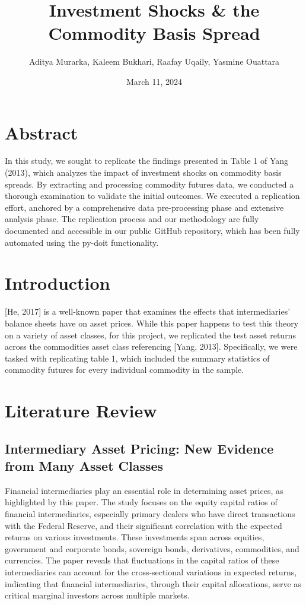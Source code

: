 \documentclass{article}
\title{Investment Shocks \& the Commodity Basis Spread}
\author{Aditya Murarka, Kaleem Bukhari, Raafay Uqaily, Yasmine Ouattara}
\date{March 11, 2024}
\begin{document}
\maketitle
\section{Abstract}

In this study, we sought to replicate the findings presented in Table 1 of Yang (2013), which analyzes the impact of investment shocks on commodity basis spreads. By extracting and processing commodity futures data, we conducted a thorough examination to validate the initial outcomes. We executed a replication effort, anchored by a comprehensive data pre-processing phase and extensive analysis phase. The replication process and our methodology are fully documented and accessible in our public GitHub repository, which has been fully automated using the py-doit functionality.

\section{Introduction}

[He, 2017] is a well-known paper that examines the effects that intermediaries' balance sheets have on asset prices. While this paper happens to test this theory on a variety of asset classes, for this project, we replicated the test asset returns across the commodities asset class referencing [Yang, 2013]. Specifically, we were tasked with replicating table 1, which included the summary statistics of commodity futures for every individual commodity in the sample.

\section{Literature Review}
\subsection{Intermediary Asset Pricing: New Evidence from Many Asset Classes}

Financial intermediaries play an essential role in determining asset prices, as highlighted by this paper. The study focuses on the equity capital ratios of financial intermediaries, especially primary dealers who have direct transactions with the Federal Reserve, and their significant correlation with the expected returns on various investments. These investments span across equities, government and corporate bonds, sovereign bonds, derivatives, commodities, and currencies. The paper reveals that fluctuations in the capital ratios of these intermediaries can account for the cross-sectional variations in expected returns, indicating that financial intermediaries, through their capital allocations, serve as critical marginal investors across multiple markets.
\end{document}
